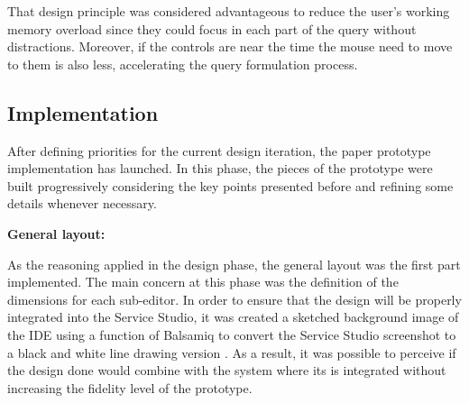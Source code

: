 That design principle was considered advantageous to reduce the user's working memory overload since they could focus in each part of the query without distractions. Moreover, if the controls are near the time the mouse need to move to them is also less, accelerating the query formulation process.




\subsection{Implementation}
\label{subsec:paper_prototype_implementation}

After defining priorities for the current design iteration, the paper prototype implementation has launched. In this phase, the pieces of the prototype were built progressively considering the key points presented before and refining some details whenever necessary.

\medskip

\textbf{General layout:}

\medskip

As the reasoning applied in the design phase, the general layout was the first part implemented. The main concern at this phase was the definition of the dimensions for each sub-editor. In order to ensure that the design will be properly integrated into the Service Studio, it was created a sketched background image of the \gls{IDE} using a function of Balsamiq \cite{balsamiq} to convert the Service Studio screenshot to a black and white line drawing version \cite{balsamiq_using_images_and_assets}. As a result, it was possible to perceive if the design done would combine with the system where its is integrated without increasing the fidelity level of the prototype.


